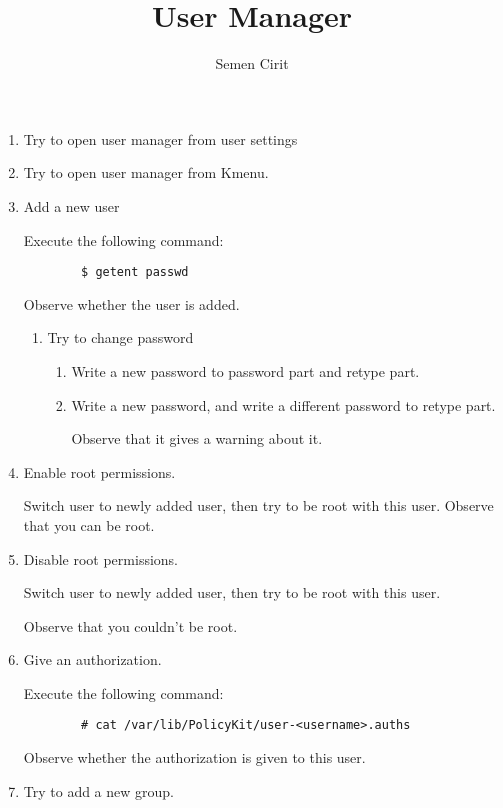 \documentclass[a4paper,10pt]{article}
\title{User Manager}
\author{Semen Cirit}
\begin{document}
\maketitle
\begin{enumerate}

\item Try to open user manager from user settings

\item Try to open user manager from Kmenu.

\item Add a new user

    Execute the following command:
    \begin{verbatim}
        $ getent passwd 
    \end{verbatim}
    Observe whether the user is added.

    \begin{enumerate}
    \item Try to change password
        \begin{enumerate}
        \item Write a new password to password part and retype part.
        \item Write a new password, and write a different password to retype part.

                Observe that it gives a warning about it.
        \end{enumerate}
    \end{enumerate}

    \item Enable root permissions.

          Switch user to newly added user, then try to be root with this user.
        Observe that you can be root.
    \item Disable root permissions.

        Switch user to newly added user, then try to be root with this user.
    
        Observe that you couldn't be root.

    \item Give an authorization.

        Execute the following command:
    \begin{verbatim}
        # cat /var/lib/PolicyKit/user-<username>.auths
    \end{verbatim}
        Observe whether the authorization is given to this user.

    
\item Try to add a new group.


\end{enumerate}
\end{document}
